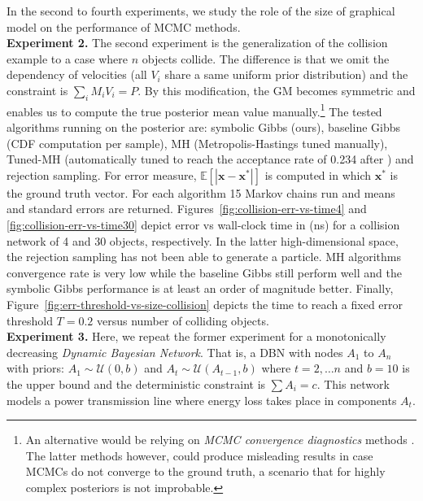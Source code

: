 \documentclass[letterpaper]{article}
\newcommand{\bvec}[1]{\textbf{#1}}
\begin{document}
In the second to fourth experiments, we study the role of the size of graphical model on the performance of MCMC methods.
\\
\textbf{Experiment 2.} The second experiment is the generalization of the collision example to a case where $n$ objects 
collide. The difference is that we omit the dependency of velocities (all $V_i$ share a same uniform prior distribution) and the constraint is $\sum_i{M_i V_i} = P$. By this modification, the GM becomes symmetric and enables us to compute the true posterior mean value manually.\footnote{An alternative would be relying on \emph{MCMC convergence diagnostics} methods \cite{cowles1996markov}. The latter methods however, could produce misleading results in case MCMCs do not converge to the ground truth, a scenario that for highly complex posteriors is not improbable.} 
The tested algorithms running on the posterior are: symbolic Gibbs (ours), baseline Gibbs (CDF computation per sample), 
MH (Metropolis-Hastings tuned manually), Tuned-MH 
(automatically tuned to reach the acceptance rate of 0.234 after \cite{roberts1997weak}) and rejection sampling.
For error measure, $\mathbb{E}[|\bvec{x} - \bvec{x}^*|]$ is computed in which 
$\bvec{x}^*$ is the ground truth vector.
For each algorithm 15 Markov chains run and means and standard errors are returned.     
Figures~\ref{fig:collision-err-vs-time4} 
and 
\ref{fig:collision-err-vs-time30} 
depict error vs wall-clock time in (ns) %
for a collision network of 4 and 30 objects, respectively. %
In the latter high-dimensional space, the rejection sampling has not been able to generate a particle.
MH algorithms convergence rate is very low while the baseline Gibbs still perform well and the symbolic Gibbs performance is at least an order of magnitude better.
Finally, Figure~\ref{fig:err-threshold-vs-size-collision} depicts the time to reach a fixed error threshold $T=0.2$ 
versus number of colliding objects. 
%
\\
\textbf{Experiment 3.} Here, we repeat the former experiment for a 
monotonically decreasing \emph{Dynamic Bayesian Network}. That is, a DBN with nodes $A_1$ to $A_n$
with priors: $A_1 \sim \mathcal{U}(0, b)$ and $A_t \sim \mathcal{U}(A_{t-1}, b)$ where 
$t = 2, \ldots n$ and $b=10$ is the upper bound and the deterministic constraint is $\sum A_i = c$.
This network models a power transmission line where energy loss takes place in components $A_t$.
\end{document}
